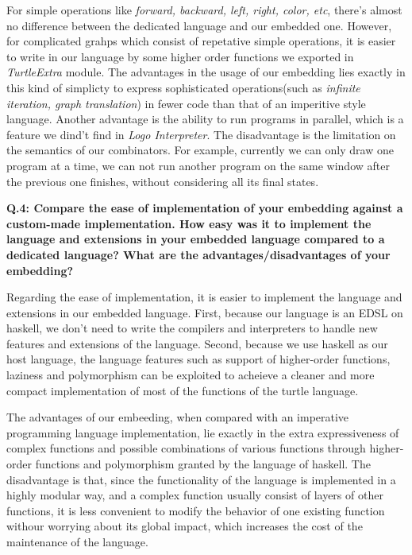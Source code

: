 \documentclass[10pt]{article}
\begin{document}
For simple operations like \textit{forward, backward, left, right, color, etc}, there's almost no difference between the dedicated language and our embedded one. However, for complicated grahps which consist of repetative simple operations, it is easier to write in our language by some higher order functions we exported in \textit{TurtleExtra} module. The advantages in the usage of our embedding lies exactly in this kind of simplicty to express sophisticated operations(such as \textit{infinite iteration, graph translation}) in fewer code than that of an imperitive style language. Another advantage is the ability to run programs in parallel, which is a feature we dind't find in \textit{Logo Interpreter}. The disadvantage is the limitation on the semantics of our combinators. For example, currently we can only draw one program at a time, we can not run another program on the same window after the previous one finishes, without considering all its final states.

\textbf{Q.4: Compare the ease of implementation of your embedding against a custom-made implementation. How easy was it to implement the language and extensions in your embedded language compared to a dedicated language? What are the advantages/disadvantages of your embedding?}

Regarding the ease of implementation, it is easier to implement the language and extensions in our embedded language. First, because our language is an EDSL on haskell, we don't need to write the compilers and interpreters to handle new features and extensions of the language. Second, because we use haskell as our host language, the language features such as support of higher-order functions, laziness and polymorphism can be exploited to acheieve a cleaner and more compact implementation of most of the functions of the turtle language. 

The advantages of our embeeding, when compared with an imperative programming language implementation, lie exactly in the extra expressiveness of complex functions and possible combinations of various functions through higher-order functions and polymorphism granted by the language of haskell. The disadvantage is that, since the functionality of the language is implemented in a highly modular way, and a complex function usually consist of layers of other functions, it is less convenient to modify the behavior of one existing function withour worrying about its global impact, which increases the cost of the maintenance of the language.
\end{document}
